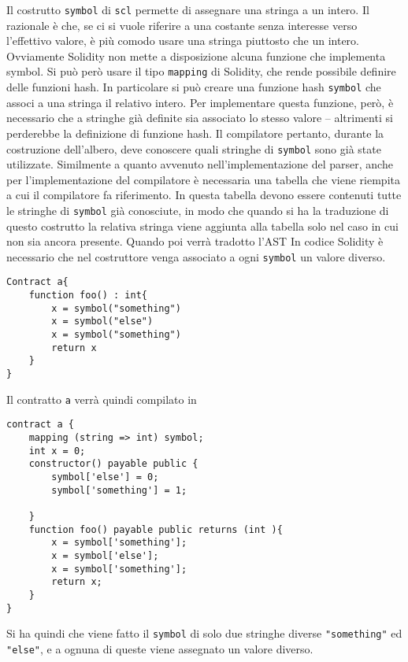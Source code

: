 \documentclass[12pt,a4paper]{report}
\begin{document}
Il costrutto \texttt{symbol} di \texttt{scl} permette di assegnare una
stringa a un intero. Il razionale è che, se ci si vuole riferire a una
costante senza interesse verso l'effettivo valore, è più comodo usare
una stringa piuttosto che un intero. Ovviamente Solidity non mette a
disposizione alcuna funzione che implementa symbol. Si può però usare il
tipo \texttt{mapping} di Solidity, che rende possibile definire delle
funzioni hash. In particolare si può creare una funzione hash
\texttt{symbol} che associ a una stringa il relativo intero. Per
implementare questa funzione, però, è necessario che a stringhe già
definite sia associato lo stesso valore -- altrimenti si perderebbe la
definizione di funzione hash. Il compilatore pertanto, durante la
costruzione dell'albero, deve conoscere quali stringhe di
\texttt{symbol} sono già state utilizzate. Similmente a quanto avvenuto
nell'implementazione del parser, anche per l'implementazione del
compilatore è necessaria una tabella che viene riempita a cui il
compilatore fa riferimento. In questa tabella devono essere contenuti
tutte le stringhe di \texttt{symbol} già conosciute, in modo che quando
si ha la traduzione di questo costrutto la relativa stringa viene
aggiunta alla tabella solo nel caso in cui non sia ancora presente.
Quando poi verrà tradotto l'AST In codice Solidity è necessario che nel
costruttore venga associato a ogni \texttt{symbol} un valore diverso.

\begin{verbatim}
Contract a{
    function foo() : int{
        x = symbol("something")
        x = symbol("else")
        x = symbol("something")
        return x
    }
}
\end{verbatim}

Il contratto \texttt{a} verrà quindi compilato in

\begin{verbatim}
contract a {
    mapping (string => int) symbol;
    int x = 0;
    constructor() payable public {
        symbol['else'] = 0;
        symbol['something'] = 1;

    }
    function foo() payable public returns (int ){
        x = symbol['something'];
        x = symbol['else'];
        x = symbol['something'];
        return x;
    }
}
\end{verbatim}

Si ha quindi che viene fatto il \texttt{symbol} di solo due stringhe
diverse \texttt{"something"} ed \texttt{"else"}, e a ognuna di queste
viene assegnato un valore diverso.
\end{document}
